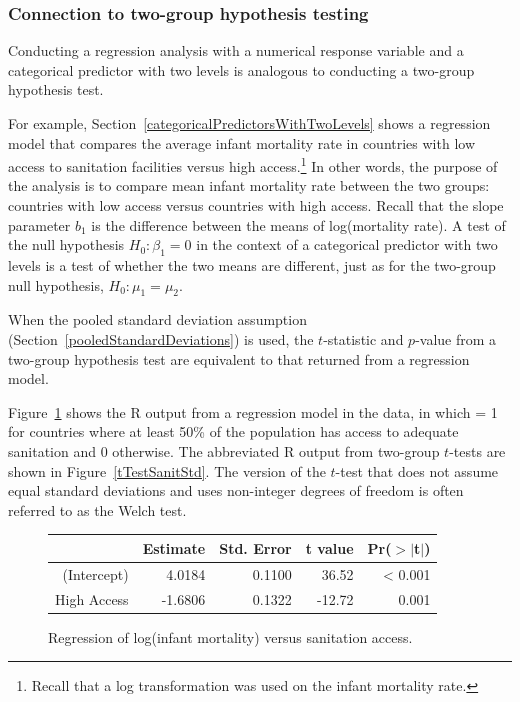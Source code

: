 \textD{\newpage}


\subsubsection{Connection to two-group hypothesis testing}
\label{categoricalTwoGroup}

Conducting a regression analysis with a numerical response variable and a categorical predictor with two levels is analogous to conducting a two-group hypothesis test. 

For example, Section~\ref{categoricalPredictorsWithTwoLevels} shows a regression model that compares the average infant mortality rate in countries with low access to sanitation facilities versus high access.\footnote{Recall that a log transformation was used on the infant mortality rate.} In other words, the purpose of the analysis is to compare mean infant mortality rate between the two groups: countries with low access versus countries with high access. Recall that the slope parameter $b_1$ is the difference between the means of log(mortality rate). A test of the null hypothesis $H_0: \beta_1 = 0$ in the context of a categorical predictor with two levels is a test of whether the two means are different, just as for the two-group null hypothesis, $H_0: \mu_1 = \mu_2$. 

When the pooled standard deviation assumption (Section~\ref{pooledStandardDeviations}) is used, the $t$-statistic and $p$-value from a two-group hypothesis test are equivalent to that returned from a regression model.

Figure~\ref{regressLogInfMortAccess} shows the \textsf{R} output from a regression model in the  data, in which  = 1 for countries where at least 50\% of the population has access to adequate sanitation and 0 otherwise. The abbreviated \textsf{R} output from two-group $t$-tests are shown in Figure~\ref{tTestSanitStd}. The version of the $t$-test that does not assume equal standard deviations and uses non-integer degrees of freedom is often referred to as the Welch test.

\begin{figure}[ht]
\centering
\begin{tabular}{rrrrr}
  \hline
 & Estimate & Std. Error & t value & Pr($>$$|$t$|$) \\ 
  \hline
(Intercept) & 4.0184 & 0.1100 & 36.52 & < 0.001 \\ 
  High Access & -1.6806 & 0.1322 & -12.72 & 0.001 \\ 
   \hline
\end{tabular}
\caption{Regression of log(infant mortality) versus sanitation access.} 
\label{regressLogInfMortAccess}
\end{figure}


